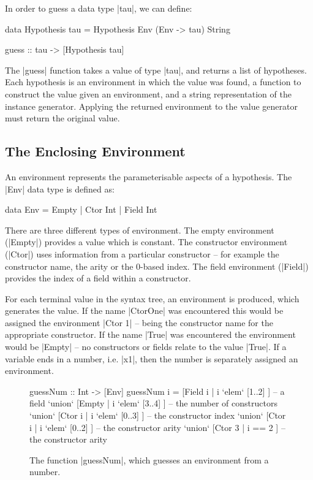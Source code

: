 \documentclass{llncs}
\begin{document}
In order to guess a data type |tau|, we can define:

\begin{code}
data Hypothesis tau = Hypothesis Env (Env -> tau) String

guess :: tau -> [Hypothesis tau]
\end{code}

The |guess| function takes a value of type |tau|, and returns a list of hypotheses. Each hypothesis is an environment in which the value was found, a function to construct the value given an environment, and a string representation of the instance generator. Applying the returned environment to the value generator must return the original value.


\subsection{The Enclosing Environment}
\label{sec:environment}

An environment represents the parameterisable aspects of a hypothesis. The |Env| data type is defined as:

\begin{code}
data Env = Empty | Ctor Int | Field Int
\end{code}

There are three different types of environment. The empty environment (|Empty|) provides a value which is constant. The constructor environment (|Ctor|) uses information from a particular constructor -- for example the constructor name, the arity or the 0-based index. The field environment (|Field|) provides the index of a field within a constructor.

For each terminal value in the syntax tree, an environment is produced, which generates the value. If the name |CtorOne| was encountered this would be assigned the environment |Ctor 1| -- being the constructor name for the appropriate constructor. If the name |True| was encountered the environment would be |Empty| -- no constructors or fields relate to the value |True|. If a variable ends in a number, i.e. |x1|, then the number is separately assigned an environment.

\begin{figure}[t]
\begin{code}
guessNum :: Int -> [Env]
guessNum i  =        [Field i  | i `elem` [1..2]  ]  -- a field
            `union`  [Empty    | i `elem` [3..4]  ]  -- the number of constructors
            `union`  [Ctor i   | i `elem` [0..3]  ]  -- the constructor index
            `union`  [Ctor i   | i `elem` [0..2]  ]  -- the constructor arity
            `union`  [Ctor 3   | i == 2           ]  -- the constructor arity
\end{code}
\caption{The function |guessNum|, which guesses an environment from a number.}
\label{fig:guessnum}
\end{figure}
\end{document}
